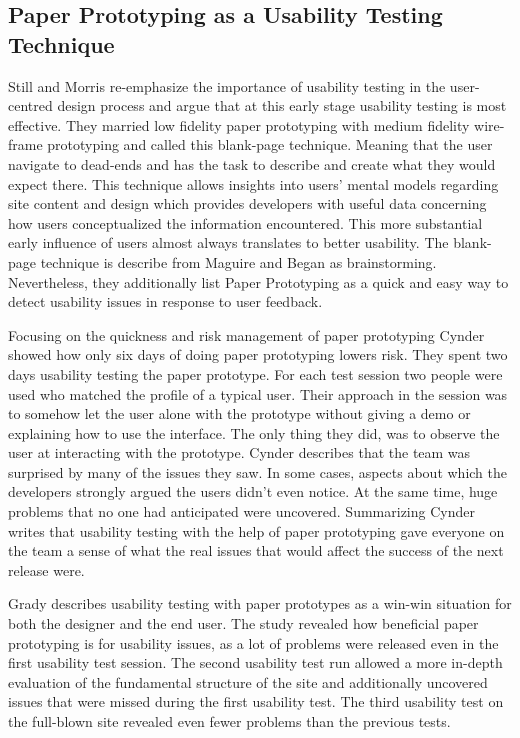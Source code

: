 \subsection{Paper Prototyping as a Usability Testing Technique}

Still and Morris \cite{still2010blank} re-emphasize the importance of usability testing in the user-centred design process and argue that at this early stage usability testing is most effective. They married low fidelity paper prototyping with medium fidelity wire-frame prototyping and called this blank-page technique. Meaning that the user navigate to dead-ends and has the task to describe and create what they would expect there. This technique allows insights into users’ mental models regarding site content and design which provides developers with useful data concerning how users conceptualized the information encountered. This more substantial early influence of users almost always translates to better usability. The blank-page technique is describe from Maguire and Began \cite{maguire2002user} as brainstorming. Nevertheless, they additionally list Paper Prototyping as a quick and easy way to detect usability issues in response to user feedback.

Focusing on the quickness and risk management of paper prototyping Cynder \cite{snyder1996using} showed how only six days of doing paper prototyping lowers risk. They spent two days usability testing the paper prototype. For each test session two people were used who matched the profile of a typical user. Their approach in the session was to somehow let the user alone with the prototype without giving a demo or explaining how to use the interface. The only thing they did, was to observe the user at interacting with the prototype. Cynder describes that the team was surprised by many of the issues they saw. In some cases, aspects about which the developers strongly argued the users didn't even notice. At the same time, huge problems that no one had anticipated were uncovered. Summarizing Cynder writes that usability testing with the help of paper prototyping gave everyone on the team a sense of what the real issues that would affect the success of the next release were.

Grady \cite{grady2000web} describes usability testing with paper prototypes as a
win-win situation for both the designer and the end user. The study revealed how beneficial paper prototyping is for usability issues, as a lot of problems were released even in the first usability test session. The second usability test run allowed a more in-depth evaluation of the fundamental structure of the site and additionally uncovered issues that were missed during the first usability test. The third usability
test on the full-blown site revealed even fewer problems than the previous tests.

